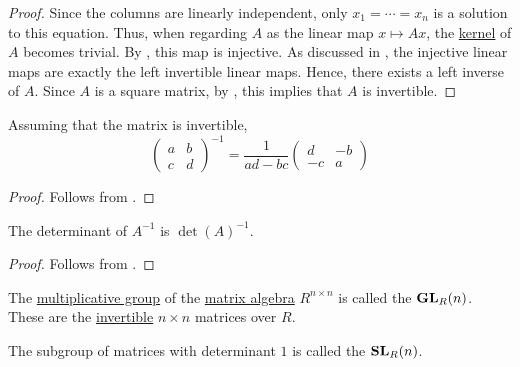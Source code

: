 \begin{proof}
  Since the columns are linearly independent, only \( x_1 = \cdots = x_n \) is a solution to this equation. Thus, when regarding \( A \) as the linear map \( x \mapsto Ax \), the \hyperref[def:module/kernel]{kernel} of \( A \) becomes trivial. By , this map is injective. As discussed in , the injective linear maps are exactly the left invertible linear maps. Hence, there exists a left inverse of \( A \). Since \( A \) is a square matrix, by , this implies that \( A \) is invertible.
\end{proof}

\begin{proposition}\label{thm:inverse_of_2x2_matrix}
  Assuming that the matrix is invertible,
  \begin{equation*}
    \begin{pmatrix}
      a & b \\
      c & d
    \end{pmatrix}^{-1}
    =
    \frac 1 {ad - bc}
    \begin{pmatrix}
      d  & -b \\
      -c & a
    \end{pmatrix}
  \end{equation*}
\end{proposition}
\begin{proof}
  Follows from .
\end{proof}

\begin{proposition}\label{thm:determinant_of_inverse}
  The determinant of \( A^{-1} \) is \( \det(A)^{-1} \).
\end{proposition}
\begin{proof}
  Follows from .
\end{proof}

\begin{definition}\label{def:linear_groups}\mimprovised
  The \hyperref[def:semiring]{multiplicative group} of the \hyperref[thm:matrix_algebra]{matrix algebra} \( R^{n \times n} \) is called the  \( \operatorname{\mathbf{GL}}_R(n) \). These are the \hyperref[def:inverse_matrix]{invertible} \( n \times n \) matrices over \( R \).

  The subgroup of matrices with determinant \( 1 \) is called the  \( \operatorname{\mathbf{SL}}_R(n) \).
\end{definition}

